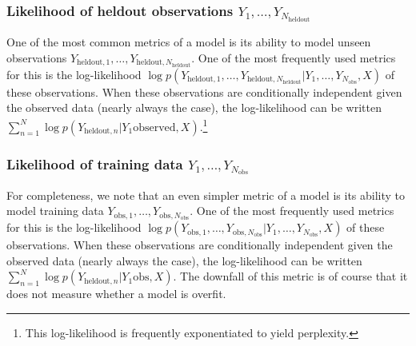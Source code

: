 \subsubsection{Likelihood of heldout observations $Y_1, \ldots, Y_{N_{\mbox{heldout}}}$}
One of the most common metrics of a model is its ability to model
unseen observations $Y_{\mbox{heldout},1}, \ldots,
Y_{\mbox{heldout},N_{\mbox{heldout}}}$.  One of the most frequently
used metrics for this is the log-likelihood $\log
p(Y_{\mbox{heldout},1}, \ldots, Y_{\mbox{heldout},N_{\mbox{heldout}}} |
  Y_1, \ldots, Y_{N_{\mbox{obs}}}, X )$ of these observations. When
  these observations are conditionally independent given the observed
  data (nearly always the case), the log-likelihood can be
  written $\sum_{n=1}^N \log p(Y_{\mbox{heldout},n} | Y_1{\mbox{observed}},
  X)$.\footnote{This log-likelihood is frequently exponentiated to
    yield perplexity.}

\subsubsection{Likelihood of training data $Y_1, \ldots, Y_{N_{\mbox{obs}}}$}
For completeness, we note that an even simpler metric of a model is its ability to model training data
$Y_{\mbox{obs},1}, \ldots, Y_{\mbox{obs},N_{\mbox{obs}}}$.
One of the most frequently used metrics for this is the log-likelihood
$\log p(Y_{\mbox{obs},1}, \ldots,
Y_{\mbox{obs},N_{\mbox{obs}}} | Y_1, \ldots,
Y_{N_{\mbox{obs}}}, X )$ of these observations. When these
observations are conditionally independent given the observed data
(nearly always the case), the log-likelihood can be written
$\sum_{n=1}^N \log p(Y_{\mbox{heldout},n} | Y_1{\mbox{obs}}, X)$.
The downfall of this metric is of course that it does not measure whether a model is overfit.



